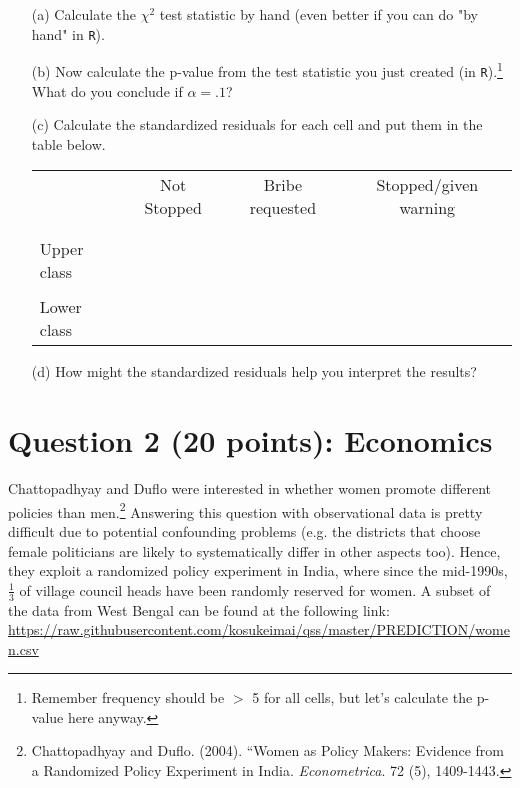 \documentclass[12pt,letterpaper]{article}
\begin{document}
\begin{enumerate}
	
	\item [(a)]
	Calculate the $\chi^2$ test statistic by hand (even better if you can do "by hand" in \texttt{R}).\\
	\vspace{7cm}
	
	\item [(b)]
	Now calculate the p-value from the test statistic you just created (in \texttt{R}).\footnote{Remember frequency should be $>$ 5 for all cells, but let's calculate the p-value here anyway.}  What do you conclude if $\alpha = .1$?\\
	
	\newpage
	\item [(c)] Calculate the standardized residuals for each cell and put them in the table below.
	\vspace{1cm}
	
	\begin{table}[h]
		\centering
		\begin{tabular}{l | c c c }
			& Not Stopped & Bribe requested & Stopped/given warning \\
			\\[-1.8ex] 
			\hline \\[-1.8ex]
			Upper class  &  &  &  \\
			\\
			Lower class &  &   &   \\
			
		\end{tabular}
	\end{table}
	
	
	\vspace{7cm}
	\item [(d)] How might the standardized residuals help you interpret the results?  
	
\end{enumerate}
\newpage

\section*{Question 2 (20 points): Economics}
Chattopadhyay and Duflo were interested in whether women promote different policies than men.\footnote{Chattopadhyay and Duflo. (2004). ``Women as Policy Makers: Evidence from a Randomized Policy Experiment in India. \textit{Econometrica}. 72 (5), 1409-1443.} Answering this question with observational data is pretty difficult due to potential confounding problems (e.g. the districts that choose female politicians are likely to systematically differ in other aspects too). Hence, they exploit a randomized policy experiment in India, where since the mid-1990s, $\frac{1}{3}$ of village council heads have been randomly reserved for women. A subset of the data from West Bengal can be found at the following link: \url{https://raw.githubusercontent.com/kosukeimai/qss/master/PREDICTION/women.csv}\\
\end{document}
